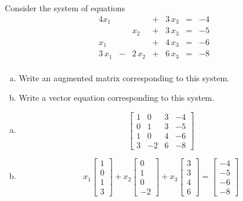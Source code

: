 
\begin{exerciseStatement}


 Consider the system of equations 
\begin{alignat*}{4} x_{1} & &  &+& 3 \, x_{3} &=& -4 \\ & & x_{2} &+& 3 \, x_{3} &=& -5 \\x_{1} & &  &+& 4 \, x_{3} &=& -6 \\3 \, x_{1} &-& 2 \, x_{2} &+& 6 \, x_{3} &=& -8 \\ \end{alignat*}
            


\begin{enumerate}[(a)]
\item  Write an augmented matrix corresponding to this system. 
\item  Write a vector equation corresponding to this system. 
\end{enumerate}
    
\end{exerciseStatement}
    
\begin{exerciseAnswer} 

\begin{enumerate}[(a)]
\item \[ \left[\begin{array}{ccc|c}
1 & 0 & 3 & -4 \\
0 & 1 & 3 & -5 \\
1 & 0 & 4 & -6 \\
3 & -2 & 6 & -8
\end{array}\right] \]
\item \[ x_{1} \left[\begin{array}{c}
1 \\
0 \\
1 \\
3
\end{array}\right] + x_{2} \left[\begin{array}{c}
0 \\
1 \\
0 \\
-2
\end{array}\right] + x_{3} \left[\begin{array}{c}
3 \\
3 \\
4 \\
6
\end{array}\right] = \left[\begin{array}{c}
-4 \\
-5 \\
-6 \\
-8
\end{array}\right] \]
\end{enumerate}
    
\end{exerciseAnswer}
    
